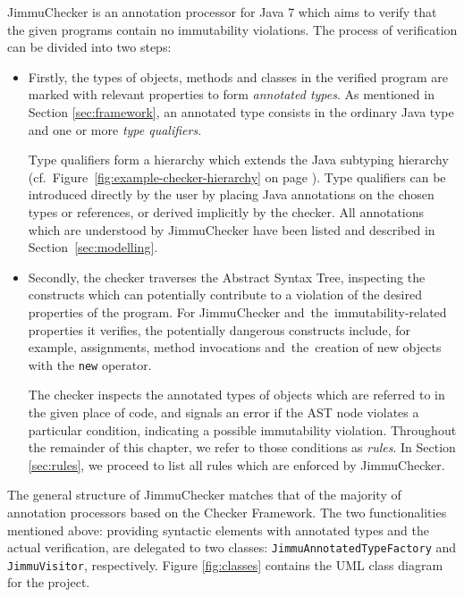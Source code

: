 \documentclass{pracamgr}
\theoremstyle{break}
\theoremstyle{break}
\theoremstyle{break}
\begin{document}
JimmuChecker is an annotation processor for Java 7 which aims to
verify that the given programs contain no immutability violations. The
process of verification can be divided into two steps:
\begin{itemize}
\item Firstly, the types of objects, methods and classes in the
  verified program are marked with relevant properties to form
  \emph{annotated types}. As mentioned in Section \ref{sec:framework},
  an annotated type consists in the ordinary Java type and one or more
  \emph{type qualifiers}.

  Type qualifiers form a hierarchy which extends the Java subtyping
  hierarchy (cf.~Fi\-gu\-re~\ref{fig:example-checker-hierarchy} on
  page \pageref{fig:example-checker-hierarchy}). Type qualifiers can
  be introduced directly by the user by placing Java annotations on
  the chosen types or references, or derived implicitly by the
  checker. All annotations which are understood by JimmuChecker have
  been listed and described in Section~\ref{sec:modelling}.
\item Secondly, the checker traverses the Abstract Syntax Tree,
  inspecting the constructs which can potentially contribute to a
  violation of the desired properties of the program. For
  JimmuChecker and~the~immutability-related properties it verifies,
  the potentially dangerous constructs include, for example,
  assignments, method invocations and~the~creation of new objects
  with the \texttt{new} operator. 

  The checker inspects the annotated types of objects which are
  referred to in the given place of code, and signals an error if the
  AST node violates a particular condition, indicating a possible
  immutability violation. Throughout the remainder of this chapter, we
  refer to those conditions as \emph{rules}. In Section
  \ref{sec:rules}, we proceed to list all rules which are enforced by
  JimmuChecker.
\end{itemize}

The general structure of JimmuChecker matches that of the majority of
annotation processors based on the Checker Framework. The two
functionalities mentioned above: pro\-vi\-ding syntactic elements with
annotated types and the actual verification, are delegated to two
classes: \texttt{JimmuAnnotatedTypeFactory} and
\texttt{JimmuVisitor}, respectively. Figure \ref{fig:classes}
contains the UML class diagram for the project.

\newcommand{\cln}[1]{\textbf{\small{#1}}}
\end{document}

